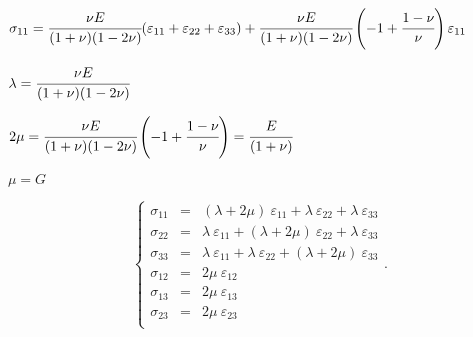 \documentclass[onecolumn,11pt]{report}
\def\lthtmlcheckvsize{\ifdim\ht\sizebox<\vsize 
  \ifdim\wd\sizebox<\hsize\expandafter\hfill\fi \expandafter\vfill
  \else\expandafter\vss\fi}%
\begin{document}
{\newpage\clearpage
{}%
$\displaystyle \sigma_{11}  = \cfrac{\nu E}{(1+\nu)(1-2\nu)}
(\varepsilon_{11} + \varepsilon_{22} + \varepsilon_{33})
+  \cfrac{\nu E}{(1+\nu)(1-2\nu)} \left( -1 + \cfrac{1-\nu}{\nu} \right) \varepsilon_{11}$%
\lthtmlindisplaymathZ
\lthtmlcheckvsize\clearpage}

{\newpage\clearpage
{}%
$\displaystyle \lambda = \cfrac{\nu E}{(1+\nu)(1-2\nu)}$%
\lthtmlindisplaymathZ
\lthtmlcheckvsize\clearpage}

{\newpage\clearpage
{}%
$\displaystyle 2\mu =  \cfrac{\nu E}{(1+\nu)(1-2\nu)} \left( -1 + \cfrac{1-\nu}{\nu} \right) = \cfrac{E}{(1+\nu)}$%
\lthtmlindisplaymathZ
\lthtmlcheckvsize\clearpage}

{\newpage\clearpage
{}%
$ \mu = G$%
\lthtmlindisplaymathZ
\lthtmlcheckvsize\clearpage}

{\newpage\clearpage
{}%
\begin{displaymath}\left\lbrace
\begin{array}{rcl}
\sigma_{11} & = & (\lambda + 2 \mu) \: \varepsilon_{11} + \lambda \: \varepsilon_{22} + \lambda \: \varepsilon_{33}\\
\sigma_{22} & = & \lambda \: \varepsilon_{11} + (\lambda + 2 \mu) \: \varepsilon_{22} + \lambda \: \varepsilon_{33}\\
\sigma_{33} & = & \lambda \: \varepsilon_{11} + \lambda \: \varepsilon_{22} + (\lambda + 2 \mu) \: \varepsilon_{33}\\
\sigma_{12} & = & 2 \mu \: \varepsilon_{12}\\
\sigma_{13} & = & 2 \mu \: \varepsilon_{13}\\
\sigma_{23} & = & 2 \mu \: \varepsilon_{23}\\
\end{array}
\right. \text{.}\end{displaymath}%
\lthtmldisplayZ
\lthtmlcheckvsize\clearpage}
\end{document}
